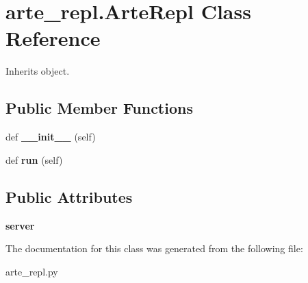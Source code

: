 \section{arte\+\_\+repl.\+Arte\+Repl Class Reference}
\label{classarte__repl_1_1_arte_repl}


Inherits object.

\subsection*{Public Member Functions}
\begin{DoxyCompactItemize}
\item 
def {\bfseries \+\_\+\+\_\+init\+\_\+\+\_\+} (self)\label{classarte__repl_1_1_arte_repl_a17500603781db1fef6797236420c83aa}

\item 
def {\bfseries run} (self)\label{classarte__repl_1_1_arte_repl_a4466fa89561fde1c11e74b3bfb9b7ecb}

\end{DoxyCompactItemize}
\subsection*{Public Attributes}
\begin{DoxyCompactItemize}
\item 
{\bfseries server}\label{classarte__repl_1_1_arte_repl_a35d716570f050ca955dd58bcc3f6256a}

\end{DoxyCompactItemize}


The documentation for this class was generated from the following file\+:\begin{DoxyCompactItemize}
\item 
arte\+\_\+repl.\+py\end{DoxyCompactItemize}
